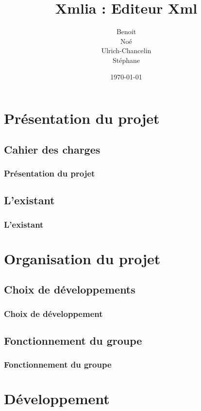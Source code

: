 \documentclass{beamer}
\title{Xmlia : Editeur Xml}
\author {
\bsc{BOIVIN} Benoit\\
\bsc{LE PHILIPPE} Noé\\
\bsc{KEGBA-SANGO-SANGO} Ulrich-Chancelin\\
\bsc{WOUTERS} Stéphane
}
\institute{}
\date{\today}
\begin{document}
	\begin{frame}
		\titlepage
	\end{frame}

	\section{Présentation du projet}

	\subsection{Cahier des charges}

	\begin{frame}
		\frametitle{Présentation du projet}
	\end{frame}

	\subsection{L'existant}

	\begin{frame}
		\frametitle{L'existant}
	\end{frame}




	\section{Organisation du projet}

	\subsection{Choix de développements}

	\begin{frame}
		\frametitle{Choix de développement}
	\end{frame}

	\subsection{Fonctionnement du groupe}

	\begin{frame}
		\frametitle{Fonctionnement du groupe}
	\end{frame}




	\section{Développement}
\end{document}
